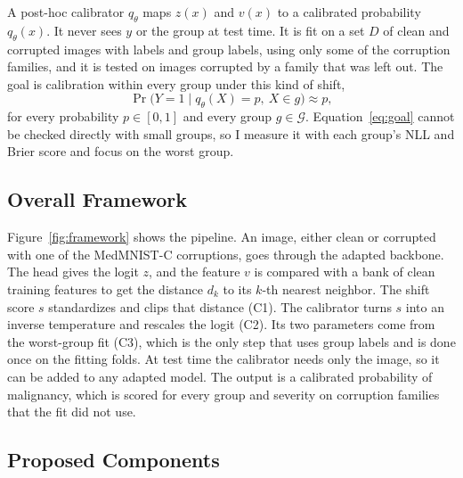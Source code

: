 \documentclass[sigconf,nonacm]{acmart}
\begin{document}
A post-hoc calibrator $q_\theta$ maps $z(x)$ and $v(x)$ to a calibrated probability $q_\theta(x)$. It never sees $y$ or the group at test time. It is fit on a set $D$ of clean and corrupted images with labels and group labels, using only some of the corruption families, and it is tested on images corrupted by a family that was left out. The goal is calibration within every group under this kind of shift,
\begin{equation}
  \Pr\big(Y = 1 \mid q_\theta(X) = p,\ X \in g\big) \approx p,
  \label{eq:goal}
\end{equation}
for every probability $p \in [0,1]$ and every group $g \in \mathcal{G}$. Equation~\eqref{eq:goal} cannot be checked directly with small groups, so I measure it with each group's NLL and Brier score and focus on the worst group.

\subsection{Overall Framework}

Figure~\ref{fig:framework} shows the pipeline. An image, either clean or corrupted with one of the MedMNIST-C corruptions, goes through the adapted backbone. The head gives the logit $z$, and the feature $v$ is compared with a bank of clean training features to get the distance $d_k$ to its $k$-th nearest neighbor. The shift score $s$ standardizes and clips that distance (C1). The calibrator turns $s$ into an inverse temperature and rescales the logit (C2). Its two parameters come from the worst-group fit (C3), which is the only step that uses group labels and is done once on the fitting folds. At test time the calibrator needs only the image, so it can be added to any adapted model. The output is a calibrated probability of malignancy, which is scored for every group and severity on corruption families that the fit did not use.

\subsection{Proposed Components}
\label{sec:components}
\end{document}
